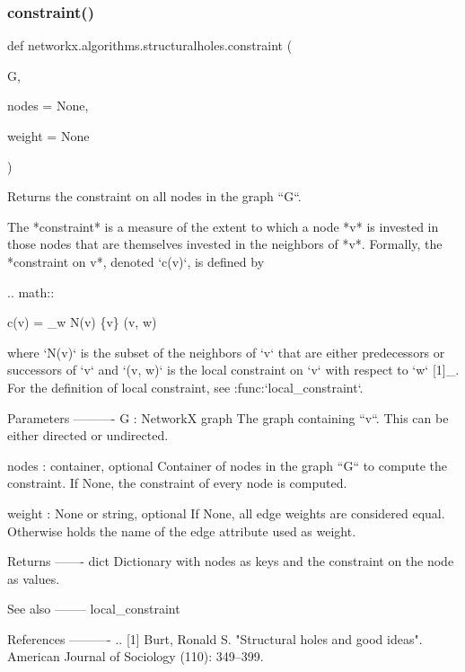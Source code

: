 \subsubsection{\texorpdfstring{constraint()}{constraint()}}
{\footnotesize\ttfamily def networkx.\+algorithms.\+structuralholes.\+constraint (\begin{DoxyParamCaption}\item[{}]{G,  }\item[{}]{nodes = {\ttfamily None},  }\item[{}]{weight = {\ttfamily None} }\end{DoxyParamCaption})}

\begin{DoxyVerb}Returns the constraint on all nodes in the graph ``G``.

The *constraint* is a measure of the extent to which a node *v* is
invested in those nodes that are themselves invested in the
neighbors of *v*. Formally, the *constraint on v*, denoted `c(v)`,
is defined by

.. math::

   c(v) = \sum_{w \in N(v) \setminus \{v\}} \ell(v, w)

where `N(v)` is the subset of the neighbors of `v` that are either
predecessors or successors of `v` and `\ell(v, w)` is the local
constraint on `v` with respect to `w` [1]_. For the definition of local
constraint, see :func:`local_constraint`.

Parameters
----------
G : NetworkX graph
    The graph containing ``v``. This can be either directed or undirected.

nodes : container, optional
    Container of nodes in the graph ``G`` to compute the constraint. If
    None, the constraint of every node is computed.

weight : None or string, optional
  If None, all edge weights are considered equal.
  Otherwise holds the name of the edge attribute used as weight.

Returns
-------
dict
    Dictionary with nodes as keys and the constraint on the node as values.

See also
--------
local_constraint

References
----------
.. [1] Burt, Ronald S.
       "Structural holes and good ideas".
       American Journal of Sociology (110): 349–399.\end{DoxyVerb}
 \mbox{\label{namespacenetworkx_1_1algorithms_1_1structuralholes_a249a78cb37c5b943131a3e30d8226e62}} 
